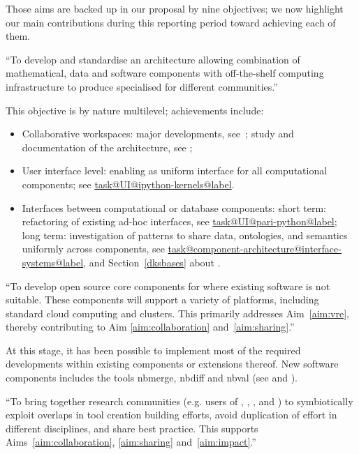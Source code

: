 \documentclass{deliverablereport}
\makeatletter
\newcommand\localtaskref[2]{\hyperref[#1@#2]{\csname task@#1@#2@label\endcsname}}
\makeatother
\begin{document}
Those aims are backed up in our proposal by nine objectives; we now
highlight our main contributions during this reporting period toward
achieving each of them.

\begin{compactenum}
\item\label{objective:framework} ``To develop and standardise an
  architecture allowing combination of mathematical, data and software
  components with off-the-shelf computing infrastructure to produce
  specialised \VREs for different communities.''

  This objective is by nature multilevel; achievements include:
  \begin{itemize}
  \item Collaborative workspaces: major \JupyterHub developments,
    see~; study and documentation of
    the \SMC architecture, see
    ;
  \item User interface level: enabling \Jupyter as uniform interface
    for all computational components; see
    \localtaskref{UI}{ipython-kernels}.
  \item Interfaces between computational or database components: short
    term: refactoring of existing ad-hoc interfaces, see
    \localtaskref{UI}{pari-python}; long term: investigation of
    patterns to share data, ontologies, and semantics uniformly across
    components, see
    \localtaskref{component-architecture}{interface-systems}, and
    Section~\ref{dksbases} about .
  \end{itemize}

\item\label{objectives:core} ``To develop open source core components
  for \VREs where existing software is not suitable. These components
  will support a variety of platforms, including standard cloud
  computing and clusters. This primarily addresses Aim~\ref{aim:vre},
  thereby contributing to Aim \ref{aim:collaboration}
  and~\ref{aim:sharing}.''

  At this stage, it has been possible to implement most of the
  required developments within existing components or extensions
  thereof. New software components includes the tools nbmerge, nbdiff and nbval
  (see  and ).

\item \label{objective:community} ``To bring together research
  communities (e.g. users of \Jupyter, \Sage, \Singular, and \GAP) to
  symbiotically exploit overlaps in tool creation building efforts,
  avoid duplication of effort in different disciplines, and share best
  practice. This supports Aims~\ref{aim:collaboration},
  \ref{aim:sharing} and~\ref{aim:impact}.''


\end{compactenum}
\end{document}
